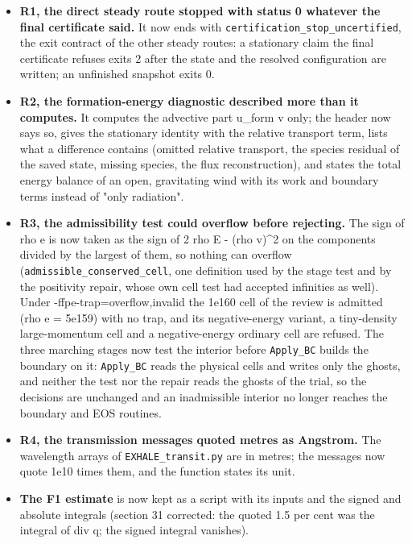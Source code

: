 \documentclass[english,a4paper]{my_memo}
\providecommand{\tightlist}{\setlength{\itemsep}{0pt}\setlength{\parskip}{0pt}}
\begin{document}
\begin{itemize}
\tightlist
\item
  \textbf{R1, the direct steady route stopped with status 0 whatever the final
  certificate said.} It now ends with \texttt{certification\_stop\_uncertified},
  the exit contract of the other steady routes: a stationary claim the final
  certificate refuses exits 2 after the state and the resolved configuration
  are written; an unfinished snapshot exits 0.
\item
  \textbf{R2, the formation-energy diagnostic described more than it computes.}
  It computes the advective part u\_form v only; the header now says so,
  gives the stationary identity with the relative transport term, lists what
  a difference contains (omitted relative transport, the species residual of
  the saved state, missing species, the flux reconstruction), and states the
  total energy balance of an open, gravitating wind with its work and
  boundary terms instead of "only radiation".
\item
  \textbf{R3, the admissibility test could overflow before rejecting.} The sign
  of rho e is now taken as the sign of 2 rho E - (rho v)\^{}2 on the components
  divided by the largest of them, so nothing can overflow
  (\texttt{admissible\_conserved\_cell}, one definition used by the stage test and by
  the positivity repair, whose own cell test had accepted infinities as
  well). Under -ffpe-trap=overflow,invalid the 1e160 cell of the review is
  admitted (rho e = 5e159) with no trap, and its negative-energy variant, a
  tiny-density large-momentum cell and a negative-energy ordinary cell are
  refused. The three marching stages now test the interior before
  \texttt{Apply\_BC} builds the boundary on it: \texttt{Apply\_BC} reads the physical cells
  and writes only the ghosts, and neither the test nor the repair reads the
  ghosts of the trial, so the decisions are unchanged and an inadmissible
  interior no longer reaches the boundary and EOS routines.
\item
  \textbf{R4, the transmission messages quoted metres as Angstrom.} The
  wavelength arrays of \texttt{EXHALE\_transit.py} are in metres; the messages now
  quote 1e10 times them, and the function states its unit.
\item
  \textbf{The F1 estimate} is now kept as a script with its inputs and the
  signed and absolute integrals (section 31 corrected: the quoted 1.5 per
  cent was the integral of \textbar div q\textbar; the signed integral vanishes).
\end{itemize}
\end{document}
